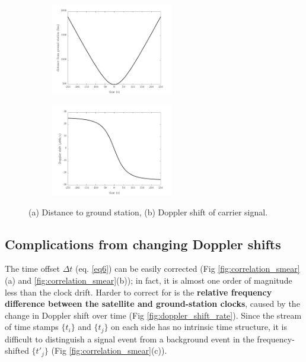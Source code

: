\begin{figure}[ht!]
	\centering
	\begin{subfigure}[t]{0.49\linewidth}
		\centering
		\includegraphics[height=4cm]{assets/distance.png}
		\subcaption{}
	\end{subfigure}
	\begin{subfigure}[t]{0.49\textwidth}
		\centering
		\includegraphics[height=4cm]{assets/doppler_shift.png}
		\subcaption{}
	\end{subfigure}
\caption{(a) Distance to ground station, (b) Doppler shift of carrier signal.}
\label{fig:doppler_shift}
\end{figure}

\subsection{Complications from changing Doppler shifts} 
The time offset $\Delta t$ (eq. \ref{eq6}) can be easily corrected (Fig \ref{fig:correlation_smear}(a) and \ref{fig:correlation_smear}(b)); in fact, it is almost one order of magnitude less than the clock drift. Harder to correct for is the \textbf{relative frequency difference between the satellite and ground-station clocks}, caused by the change in Doppler shift over time (Fig \ref{fig:doppler_shift_rate}). Since the stream of time stamps $\{t_i\}$ and $\{t_j\}$ on each side has no intrinsic time structure, it is difficult to distinguish a signal event from a background event in the frequency-shifted $\{t'_j\}$ (Fig \ref{fig:correlation_smear}(c)).\\ 

